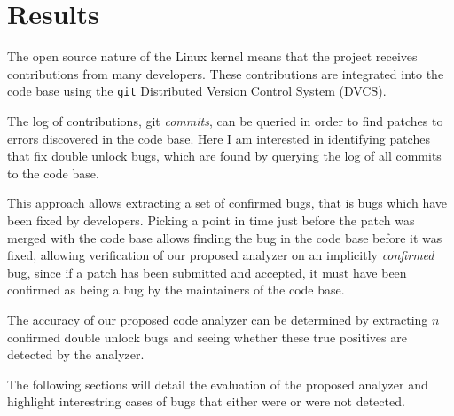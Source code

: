 \section{Results}

\newpar The open source nature of the Linux kernel means that the project receives contributions from many developers. These contributions are integrated into the code base using the \texttt{git} Distributed Version Control System (DVCS). 

\newpar The log of contributions, git \textit{commits}, can be queried in order to find patches to errors discovered in the code base. Here I am interested in identifying patches that fix double unlock bugs, which are found by querying the log of all commits to the code base. 

\newpar This approach allows extracting a set of confirmed bugs, that is bugs which have been fixed by developers. Picking a point in time just before the patch was merged with the code base allows finding the bug in the code base before it was fixed, allowing verification of our proposed analyzer on an implicitly \textit{confirmed} bug, since if a patch has been submitted and accepted, it must have been confirmed as being a bug by the maintainers of the code base.

\newpar The accuracy of our proposed code analyzer can be determined by extracting $n$ confirmed double unlock bugs and seeing whether these true positives are detected by the analyzer. 

\newpar The following sections will detail the evaluation of the proposed analyzer and highlight interestring cases of bugs that either were or were not detected. 